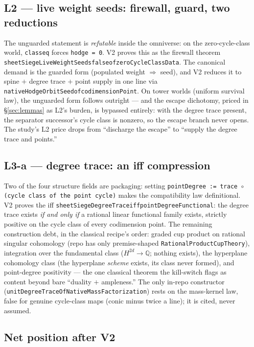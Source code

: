\documentclass[11pt]{article}
\renewcommand{\_}{\textunderscore\allowbreak}
\begin{document}
\subsection*{L2 --- live weight seeds: firewall, guard, two reductions}

The unguarded statement is \emph{refutable} inside the omniverse: on the
zero-cycle-class world, \texttt{class\_eq} forces \texttt{hodge = 0}. V2
proves this as the firewall theorem
\texttt{sheetSiegeLiveWeightSeeds\_false\_of\_zeroCycleClassData}. The
canonical demand is the guarded form (populated weight $\Rightarrow$ seed),
and V2 reduces it to spine $+$ degree trace $+$ point supply in one line via
\texttt{nativeHodgeOrbitSeed\_of\_codimensionPoint}. On tower worlds (uniform
survival law), the unguarded form follows outright --- and the escape
dichotomy, priced in \S\ref{sec:lemmas} as L2's burden, is bypassed entirely:
with the degree trace present, the separator successor's cycle class is
nonzero, so the escape branch never opens. The study's L2 price drops from
``discharge the escape'' to ``supply the degree trace and points.''

\subsection*{L3-a --- degree trace: an iff compression}

Two of the four structure fields are packaging: setting
\texttt{pointDegree := trace $\circ$ (cycle class of the point cycle)} makes
the compatibility law definitional. V2 proves the iff
\texttt{sheetSiegeDegreeTrace\_iff\_pointDegreeFunctional}:
the degree trace exists \emph{if and only if} a rational linear functional
family exists, strictly positive on the cycle class of every codimension
point. The remaining construction debt, in the classical recipe's order:
graded cup product on rational singular cohomology (repo has only
premise-shaped \texttt{RationalProductCupTheory}), integration over the
fundamental class ($H^{2d} \to \mathbb{Q}$; nothing exists), the hyperplane
cohomology class (the hyperplane \emph{scheme} exists, its class never
formed), and point-degree positivity --- the one classical theorem the
kill-switch flags as content beyond bare ``duality $+$ ampleness.'' The only
in-repo constructor (\texttt{unitDegreeTraceOfNativeMassFactorization}) rests
on the mass-kernel law, false for genuine cycle-class maps (conic minus twice
a line); it is cited, never assumed.

\subsection*{Net position after V2}
\end{document}

